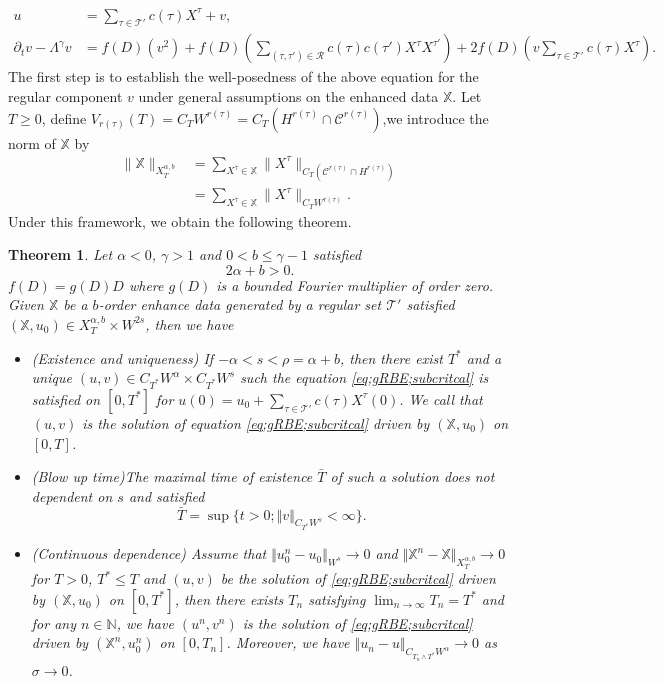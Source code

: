 \documentclass{article}
\newtheorem{theorem}{Theorem}[section]
\numberwithin{equation}{section}
\newcommand{\m}{\mathbb}
\newcommand{\ml}{\mathcal}
\begin{document}
\begin{equation}\label{eq;gRBE;subcritcal}
\begin{aligned}
u&=\sum_{\tau\in\ml T'}c(\tau)X^\tau+v,\\
\partial_t v-\Lambda^\gamma v
&=f(D)(v^2)+f(D)\left(\sum_{(\tau,\tau')\in\ml R}c(\tau)c(\tau')X^\tau X^{\tau'}\right)+2f(D)\left(v\sum_{\tau\in\ml T'}c(\tau)X^\tau
\right).
\end{aligned}
\end{equation}
The first step is to establish the well-posedness of the above equation for
the regular component $v$ under general assumptions on the enhanced data
$\m X$. Let $T\geq0$, define $V_{r(\tau)}(T)=C_TW^{r(\tau)}=C_T(H^{r(\tau)}\cap\ml C^{r(\tau)})$,we introduce the norm of $\m X$ by
\begin{align*}
\|\m X\|_{X_T^{\alpha,b}}
&=
\sum_{X^\tau\in\m X}
\|X^\tau\|_{C_T(\ml C^{r(\tau)}\cap H^{r(\tau)})}\\
&=
\sum_{X^\tau\in\m X}
\|X^\tau\|_{C_TW^{r(\tau)}} .
\end{align*}
Under this framework, we obtain the following theorem.
\begin{theorem}\label{th;local result;gRBE;subcritical}
	 Let $\alpha<0$, $\gamma> 1$ and $0<b\leq\gamma-1$ satisfied 
	 $$2\alpha+b>0.$$ $f(D)=g(D) D$ where $g(D)$ is a bounded Fourier multiplier of order zero. Given $\m X$ be a $b$-order enhance data generated by a regular set $\ml T'$ satisfied $(\m X,u_0)\in X_T^{\alpha,b}\times W^{2s}$, then we have
	 \begin{itemize}
		\item{ (Existence and uniqueness) If  $-\alpha<s<\rho=\alpha+b$, then there exist $T^*$ and a unique $(u,v)\in C_{T^*}W^\alpha\times C_{T^*}W^s$ such the equation \eqref{eq;gRBE;subcritcal} is satisfied on $[0,T^*]$ for $u(0)=u_0+\sum_{\tau\in\ml T'}c(\tau) X^\tau(0)$. We call that $(u,v)$ is the solution of  equation \eqref{eq;gRBE;subcritcal} driven by $(\m X,u_0)$ on $[0,T]$.}
		\item{(Blow up time)The maximal time of existence $\bar T$ of such a solution does not dependent on $s$ and satisfied
		\begin{equation}
			\bar T=\sup\{t>0; \Vert v\Vert_{C_{T^*}W^s}<\infty\}.
		\end{equation}
		}
		\item{(Continuous dependence)
	Assume that  $\Vert u_0^n-u_0\Vert_{W^s}\to0$ and  $\Vert \m X^n-\m X\Vert _{X_{T}^{\alpha,b}}\to0$ for $T>0$, $T^*\leq T$ and $(u,v)$ be the solution of \eqref{eq;gRBE;subcritcal}  driven by $(\m X,u_0)$ on $[0,T^*]$, then there exists $T_n$ satisfying $\lim_{n\to\infty} T_n= T^*$ and for any $n\in \m N$, we have $(u^n,v^n)$ is the solution of \eqref{eq;gRBE;subcritcal} driven by $(\m X^n,u^n_0)$ on $[0,T_n]$. Moreover, we have $\Vert u_n-u\Vert_{C_{T_n\wedge T^*}W^\alpha}\to0$ as $\sigma\to0$. }
	\end{itemize}
\end{theorem}
\end{document}
